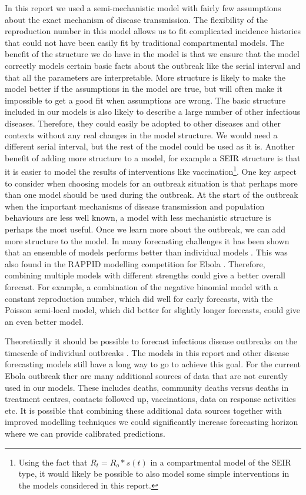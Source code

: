 \documentclass[12pt]{article}
\begin{document}
In this report we used a semi-mechanistic model with fairly few assumptions about the exact mechanism of disease transmission. The flexibility of the reproduction number in this model allows us to fit complicated incidence histories that could not have been easily fit by traditional compartmental models. The benefit of the structure we do have in the model is that we ensure that the model correctly models certain basic facts about the outbreak like the serial interval and that all the parameters are interpretable. More structure is likely to make the model better if the assumptions in the model are true, but will often make it impossible to get a good fit when assumptions are wrong. The basic structure included in our models is also likely to describe a large number of other infectious diseases. Therefore, they could easily be adopted to other diseases and other contexts without any real changes in the model structure. We would need a different serial interval, but the rest of the model could be used as it is. Another benefit of adding more structure to a model, for example a SEIR structure is that it is easier to model the results of interventions like vaccination\footnote{Using the fact that $R_t=R_o*s(t)$ in a compartmental model of the SEIR type, it would likely be possible to also model some simple interventions in the models considered in this report.}. One key aspect to consider when choosing models for an outbreak situation is that perhaps more than one model should be used during the outbreak. At the start of the outbreak when the important mechanisms of disease transmission and population behaviours are less well known, a model with less mechanistic structure is perhaps the most useful. Once we learn more about the outbreak, we can add more structure to the model. In many forecasting challenges it has been shown that an ensemble of models performs better than individual models \cite{dietterichEnsembleMethodsMachine2000, yaoUsingStackingAverage2018}. This was also found in the RAPPID modelling competition for Ebola \cite{viboudRAPIDDEbolaForecasting2018}. Therefore, combining multiple models with different strengths could give a better overall forecast. For example, a combination of the negative binomial model with a constant reproduction number, which did well for early forecasts, with the Poisson semi-local model, which did better for slightly longer forecasts, could give an even better model.

Theoretically it should be possible to forecast infectious disease outbreaks on the timescale of individual outbreaks \cite{scarpinoPredictabilityInfectiousDisease2019}. The models in this report and other disease forecasting models still have a long way to go to achieve this goal. For the current Ebola outbreak ther are many additional sources of data that are not curently used in our models. These includes deaths, community deaths versus deaths in treatment centres, contacts followed up, vaccinations, data on response activities etc. It is possible that combining these additional data sources together with improved modelling techniques we could significantly increase forecasting horizon where we can provide calibrated predictions. 
\end{document}
